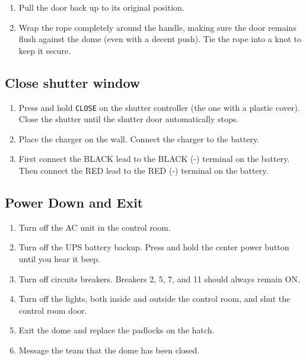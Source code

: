 \documentclass{article}
\begin{document}
	\begin{enumerate}
		
		\item Pull the door back up to its original position.
		
		\item Wrap the rope completely around the handle, making sure the door remains flush against the dome (even with a decent push). Tie the rope into a knot to keep it secure.
		
	\end{enumerate}
	
	\subsection{Close shutter window}
	\label{sec:close-shutter-window}
	
	\begin{enumerate}
		
		\item Press and hold \texttt{CLOSE} on the shutter controller (the one with a plastic cover). Close the shutter until the shutter door automatically stops.

		\item Place the charger on the wall. Connect the charger to the battery.
		
		\item First connect the BLACK lead to the BLACK (-) terminal on the battery. Then connect the RED lead to the RED (-) terminal on the battery.
		
	\end{enumerate}
	
	\subsection{Power Down and Exit}
	\label{sec:power-down-and-exit}
	
	\begin{enumerate}
		
		\item Turn off the AC unit in the control room.
		
		\item Turn off the UPS battery backup. Press and hold the center power button until you hear it beep.
		
		\item Turn off circuits breakers. Breakers 2, 5, 7, and 11 should always remain ON.
		
		\item Turn off the lights, both inside and outside the control room, and shut the control room door.
		
		\item Exit the dome and replace the padlocks on the hatch.
		
		\item Message the team that the dome has been closed.
		
	\end{enumerate}
\end{document}
